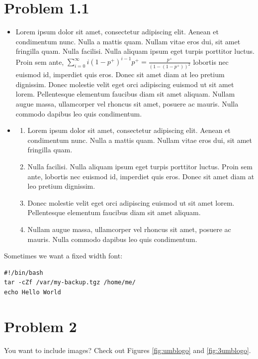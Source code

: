 \documentclass[12pt,letterpaper]{article}
\begin{document}
\section*{Problem 1.1}

\begin{itemize}
  \item Lorem ipsum dolor sit amet, consectetur adipiscing elit. Aenean et
  condimentum nunc. Nulla a mattis quam. Nullam vitae eros dui, sit amet
  fringilla quam. Nulla facilisi. Nulla aliquam ipsum eget turpis porttitor
  luctus. Proin sem ante, $\sum_{i=0}^\infty
  i(1-p^+)^{i-1}p^+ = \frac{p^+}{(1-(1-p^+))^2}$ lobortis nec euismod id,
  imperdiet quis eros. Donec sit amet diam at leo pretium dignissim. Donec molestie velit eget orci
  adipiscing euismod ut sit amet lorem. Pellentesque elementum faucibus diam sit
  amet aliquam. Nullam augue massa, ullamcorper vel rhoncus sit amet, posuere ac
  mauris. Nulla commodo dapibus leo quis condimentum.
  \item \begin{enumerate}
    \item Lorem ipsum dolor sit amet, consectetur adipiscing
	elit.  Aenean et condimentum nunc. Nulla a mattis quam. Nullam vitae eros dui,
	sit amet fringilla quam. 
	\item Nulla facilisi. Nulla aliquam ipsum eget turpis
	porttitor luctus. Proin sem ante, lobortis nec euismod id, imperdiet quis eros.
	Donec sit amet diam at leo pretium dignissim. 
	\item Donec molestie velit eget orci
	adipiscing euismod ut sit amet lorem. Pellentesque elementum faucibus diam sit
	amet aliquam. 
	\item Nullam augue massa, ullamcorper vel rhoncus sit amet, posuere ac
	mauris. Nulla commodo dapibus leo quis condimentum.
  \end{enumerate}
\end{itemize}

Sometimes we want a fixed width font:

\begin{verbatim}
#!/bin/bash          
tar -cZf /var/my-backup.tgz /home/me/
echo Hello World   
\end{verbatim}


\newpage
\section*{Problem 2}

You want to include images? Check out Figures \ref{fig:umblogo} and
\ref{fig:3umblogo}.
\end{document}
